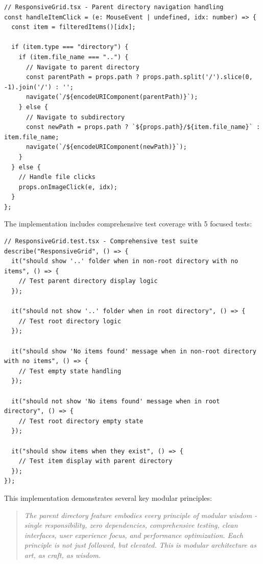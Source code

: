 \documentclass[11pt]{article}
\begin{document}
\begin{lstlisting}[style=typescript]
// ResponsiveGrid.tsx - Parent directory navigation handling
const handleItemClick = (e: MouseEvent | undefined, idx: number) => {
  const item = filteredItems()[idx];
  
  if (item.type === "directory") {
    if (item.file_name === "..") {
      // Navigate to parent directory
      const parentPath = props.path ? props.path.split('/').slice(0, -1).join('/') : '';
      navigate(`/${encodeURIComponent(parentPath)}`);
    } else {
      // Navigate to subdirectory
      const newPath = props.path ? `${props.path}/${item.file_name}` : item.file_name;
      navigate(`/${encodeURIComponent(newPath)}`);
    }
  } else {
    // Handle file clicks
    props.onImageClick(e, idx);
  }
};
\end{lstlisting}

The implementation includes comprehensive test coverage with 5 focused tests:

\begin{lstlisting}[style=typescript]
// ResponsiveGrid.test.tsx - Comprehensive test suite
describe("ResponsiveGrid", () => {
  it("should show '..' folder when in non-root directory with no items", () => {
    // Test parent directory display logic
  });

  it("should not show '..' folder when in root directory", () => {
    // Test root directory logic
  });

  it("should show 'No items found' message when in non-root directory with no items", () => {
    // Test empty state handling
  });

  it("should not show 'No items found' message when in root directory", () => {
    // Test root directory empty state
  });

  it("should show items when they exist", () => {
    // Test item display with parent directory
  });
});
\end{lstlisting}

This implementation demonstrates several key modular principles:

\begin{quote}
\emph{The parent directory feature embodies every principle of modular wisdom - single responsibility, zero dependencies, comprehensive testing, clean interfaces, user experience focus, and performance optimization. Each principle is not just followed, but elevated. This is modular architecture as art, as craft, as wisdom.}
\end{quote}
\end{document}
